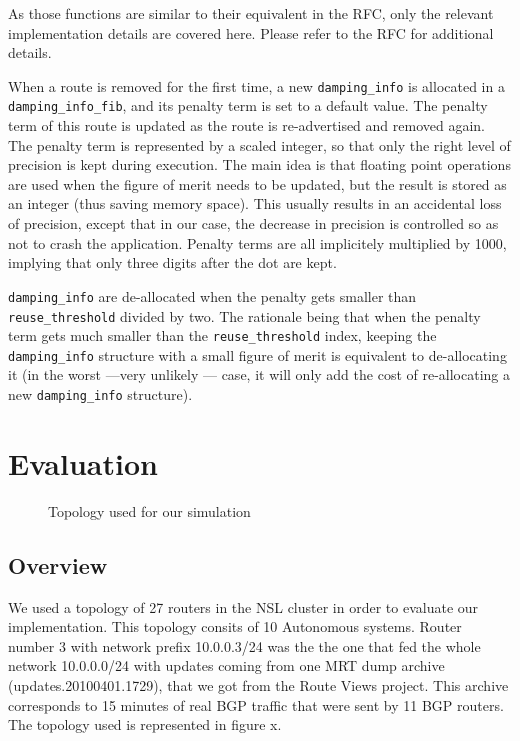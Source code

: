\documentclass[a4paper,english]{IEEEtran}
\begin{document}
As those functions are similar to their equivalent in the RFC, only the relevant implementation details are covered here.
Please refer to the RFC for additional details.

When a route is removed for the first time, a new {\tt\small damping\_info} is allocated in a {\tt\small damping\_info\_fib}, and its penalty term is set to a default value.
The penalty term of this route is updated as the route is re-advertised and removed again.
The penalty term is represented by a scaled integer, so that only the right level of precision is kept during execution.
The main idea is that floating point operations are used when the figure of merit needs to be updated, but the result is stored as an integer (thus saving memory space).
This usually results in an accidental loss of precision, except that in our case, the decrease in precision is controlled so as not to crash the application.
Penalty terms are all implicitely multiplied by 1000, implying that only three digits after the dot are kept.

{\tt\small damping\_info} are de-allocated when the penalty gets smaller than {\tt\small reuse\_threshold} divided by two.
The rationale being that when the penalty term gets much smaller than the {\tt\small reuse\_threshold} index, keeping the {\tt\small damping\_info} structure with a small figure of merit is equivalent to de-allocating it (in the worst ---very unlikely --- case, it will only add the cost of re-allocating a new {\tt\small damping\_info} structure).

\section{Evaluation}

\begin{figure}
\caption{Topology used for our simulation}

\end{figure}

\subsection{Overview}

We used a topology of 27 routers in the NSL cluster in order to evaluate
our implementation. This topology consits of 10 Autonomous systems.
Router number 3 with network prefix 10.0.0.3/24 was the the one that
fed the whole network 10.0.0.0/24 with updates coming from one MRT
dump archive (updates.20100401.1729), that we got from the Route Views
project\cite{routeviews}. This archive corresponds to 15 minutes
of real BGP traffic that were sent by 11 BGP routers. The topology
used is represented in figure x.
\end{document}
